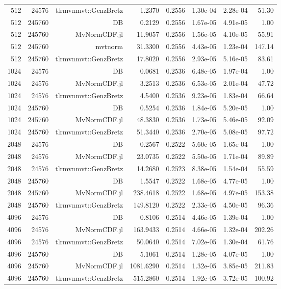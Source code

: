 \begin{tabular}{|r|r|r|r|r|r|r|r|}
  512 & 24576 & tlrmvnmvt::GenzBretz & 1.2370 & 0.2556 & 1.30e-04 & 2.28e-04 & 51.30 \\
  512 & 245760 & DB & 0.2129 & 0.2556 & 1.67e-05 & 4.91e-05 & 1.00 \\
  512 & 245760 & MvNormCDF.jl & 11.9057 & 0.2556 & 1.56e-05 & 4.10e-05 & 55.91 \\
  512 & 245760 & mvtnorm & 31.3300 & 0.2556 & 4.43e-05 & 1.23e-04 & 147.14 \\
  512 & 245760 & tlrmvnmvt::GenzBretz & 17.8020 & 0.2556 & 2.93e-05 & 5.16e-05 & 83.61 \\
  1024 & 24576 & DB & 0.0681 & 0.2536 & 6.48e-05 & 1.97e-04 & 1.00 \\
  1024 & 24576 & MvNormCDF.jl & 3.2513 & 0.2536 & 6.53e-05 & 2.01e-04 & 47.72 \\
  1024 & 24576 & tlrmvnmvt::GenzBretz & 4.5400 & 0.2536 & 9.23e-05 & 1.83e-04 & 66.64 \\
  1024 & 245760 & DB & 0.5254 & 0.2536 & 1.84e-05 & 5.20e-05 & 1.00 \\
  1024 & 245760 & MvNormCDF.jl & 48.3830 & 0.2536 & 1.73e-05 & 5.46e-05 & 92.09 \\
  1024 & 245760 & tlrmvnmvt::GenzBretz & 51.3440 & 0.2536 & 2.70e-05 & 5.08e-05 & 97.72 \\
  2048 & 24576 & DB & 0.2567 & 0.2522 & 5.60e-05 & 1.65e-04 & 1.00 \\
  2048 & 24576 & MvNormCDF.jl & 23.0735 & 0.2522 & 5.50e-05 & 1.71e-04 & 89.89 \\
  2048 & 24576 & tlrmvnmvt::GenzBretz & 14.2680 & 0.2523 & 8.38e-05 & 1.54e-04 & 55.59 \\
  2048 & 245760 & DB & 1.5547 & 0.2522 & 1.68e-05 & 4.77e-05 & 1.00 \\
  2048 & 245760 & MvNormCDF.jl & 238.4618 & 0.2522 & 1.68e-05 & 4.97e-05 & 153.38 \\
  2048 & 245760 & tlrmvnmvt::GenzBretz & 149.8120 & 0.2522 & 2.33e-05 & 4.50e-05 & 96.36 \\
  4096 & 24576 & DB & 0.8106 & 0.2514 & 4.46e-05 & 1.39e-04 & 1.00 \\
  4096 & 24576 & MvNormCDF.jl & 163.9433 & 0.2514 & 4.66e-05 & 1.32e-04 & 202.26 \\
  4096 & 24576 & tlrmvnmvt::GenzBretz & 50.0640 & 0.2514 & 7.02e-05 & 1.30e-04 & 61.76 \\
  4096 & 245760 & DB & 5.1061 & 0.2514 & 1.28e-05 & 4.07e-05 & 1.00 \\
  4096 & 245760 & MvNormCDF.jl & 1081.6290 & 0.2514 & 1.32e-05 & 3.85e-05 & 211.83 \\
  4096 & 245760 & tlrmvnmvt::GenzBretz & 515.2860 & 0.2514 & 1.92e-05 & 3.72e-05 & 100.92 \\
  \hline
\end{tabular}
